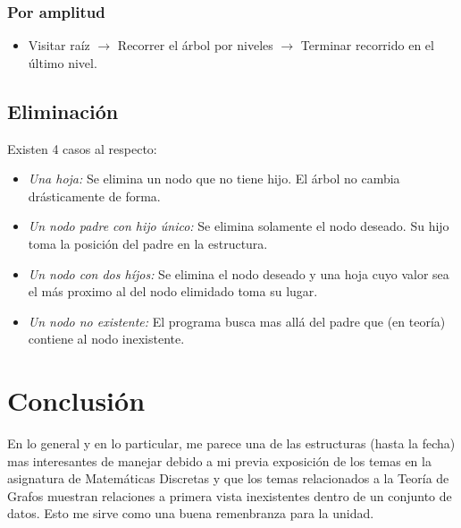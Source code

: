 \documentclass[letterpaper, 12pt]{article}
\begin{document}
\begin{justify}
            \subsubsection{Por amplitud}
            \begin{itemize}
                \item Visitar raíz \(\rightarrow\) Recorrer el árbol por niveles \(\rightarrow\) Terminar recorrido en el último nivel.
            \end{itemize}
            \subsection{Eliminación}
            Existen 4 casos al respecto:
            \begin{itemize}
                \item \emph{Una hoja:} Se elimina un nodo que no tiene hijo. El árbol no cambia drásticamente de forma.
                \item \emph{Un nodo padre con hijo único:} Se elimina solamente el nodo deseado. Su hijo toma la posición del padre en la estructura.
                \item \emph{Un nodo con dos híjos:} Se elimina el nodo deseado y una hoja cuyo valor sea el más proximo al del nodo elimidado toma su lugar.
                \item \emph{Un nodo no existente:} El programa busca mas allá del padre que (en teoría) contiene al nodo inexistente.
            \end{itemize}

            \section{Conclusión}
            En lo general y en lo particular, me parece una de las estructuras (hasta la fecha) mas interesantes de manejar debido a mi previa exposición de los temas en la asignatura de Matemáticas Discretas y que los temas relacionados a la Teoría de Grafos muestran relaciones a primera vista inexistentes dentro de un conjunto de datos.
            Esto me sirve como una buena remenbranza para la unidad.
        \end{justify}
\end{document}
